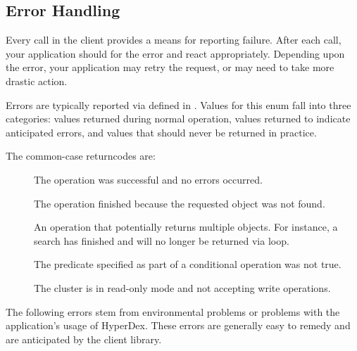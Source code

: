 \subsection{Error Handling}
\label{sec:api:c:client:error-handling}

Every call in the client provides a means for reporting failure.  After each
call, your application should for the error and react appropriately.  Depending
upon the error, your application may retry the request, or may need to take more
drastic action.

Errors are typically reported via 
defined in .  Values for this enum fall into three
categories:  values returned during normal operation, values returned to
indicate anticipated errors, and values that should never be returned in
practice.

The common-case returncodes are:

\begin{description}
\item[]  The operation was successful and no
    errors occurred.
\item[]  The operation finished because the
    requested object was not found.
\item[]  An operation that potentially
    returns multiple objects.  For instance, a search has
    finished and will no longer be returned via loop.
\item[]  The predicate specified as part of a
    conditional operation was not true.
\item[] The cluster is in read-only mode and
    not accepting write operations.
\end{description}

The following errors stem from environmental problems or problems with the
application's usage of HyperDex.  These errors are generally easy to remedy and
are anticipated by the client library.

